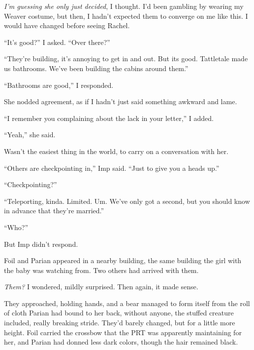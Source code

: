 \emph{I'm guessing she only just decided}, I thought.  I'd been gambling by wearing my Weaver costume, but then, I hadn't expected them to converge on me like this.  I would have changed before seeing Rachel.



``It's good?'' I asked.  ``Over there?''



``They're building, it's annoying to get in and out.  But its good.  Tattletale made us bathrooms.  We've been building the cabins around them.''



``Bathrooms are good,'' I responded.



She nodded agreement, as if I hadn't just said something awkward and lame.



``I remember you complaining about the lack in your letter,'' I added.



``Yeah,'' she said.



Wasn't the easiest thing in the world, to carry on a conversation with her.



``Others are checkpointing in,'' Imp said.  ``Just to give you a heads up.''



``Checkpointing?''



``Teleporting, kinda.  Limited.  Um.  We've only got a second, but you should know in advance that they're married.''



``Who?''



But Imp didn't respond.



Foil and Parian appeared in a nearby building, the same building the girl with the baby was watching from.  Two others had arrived with them.



\emph{Them?}  I wondered, mildly surprised.  Then again, it made sense.



They approached, holding hands, and a bear managed to form itself from the roll of cloth Parian had bound to her back, without anyone, the stuffed creature included, really breaking stride.  They'd barely changed, but for a little more height.  Foil carried the crossbow that the PRT was apparently maintaining for her, and Parian had donned less dark colors, though the hair remained black.



